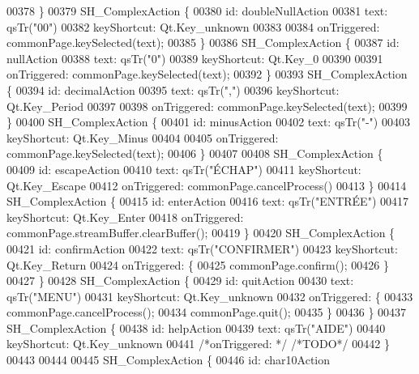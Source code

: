 \begin{DoxyCode}
00378     \}
00379     SH\_ComplexAction \{
00380         \textcolor{keywordtype}{id}: doubleNullAction
00381         text: qsTr(\textcolor{stringliteral}{"00"})
00382         keyShortcut: Qt.Key\_unknown
00383 
00384         onTriggered: commonPage.keySelected(text);
00385     \}
00386     SH\_ComplexAction \{
00387         \textcolor{keywordtype}{id}: nullAction
00388         text: qsTr(\textcolor{stringliteral}{"0"})
00389         keyShortcut: Qt.Key\_0
00390 
00391         onTriggered: commonPage.keySelected(text);
00392     \}
00393     SH\_ComplexAction \{
00394         \textcolor{keywordtype}{id}: decimalAction
00395         text: qsTr(\textcolor{stringliteral}{","})
00396         keyShortcut: Qt.Key\_Period
00397 
00398         onTriggered: commonPage.keySelected(text);
00399     \}
00400     SH\_ComplexAction \{
00401         \textcolor{keywordtype}{id}: minusAction
00402         text: qsTr(\textcolor{stringliteral}{"-"})
00403         keyShortcut: Qt.Key\_Minus
00404 
00405         onTriggered: commonPage.keySelected(text);
00406     \}
00407 
00408     SH\_ComplexAction \{
00409         \textcolor{keywordtype}{id}: escapeAction
00410         text: qsTr(\textcolor{stringliteral}{"ÉCHAP"})
00411         keyShortcut: Qt.Key\_Escape
00412         onTriggered: commonPage.cancelProcess()
00413     \}
00414     SH\_ComplexAction \{
00415         \textcolor{keywordtype}{id}: enterAction
00416         text: qsTr(\textcolor{stringliteral}{"ENTRÉE"})
00417         keyShortcut: Qt.Key\_Enter
00418         onTriggered: commonPage.streamBuffer.clearBuffer();
00419     \}
00420     SH\_ComplexAction \{
00421         \textcolor{keywordtype}{id}: confirmAction
00422         text: qsTr(\textcolor{stringliteral}{"CONFIRMER"})
00423         keyShortcut: Qt.Key\_Return
00424         onTriggered: \{
00425             commonPage.confirm();
00426         \}
00427     \}
00428     SH\_ComplexAction \{
00429         \textcolor{keywordtype}{id}: quitAction
00430         text: qsTr(\textcolor{stringliteral}{"MENU"})
00431         keyShortcut: Qt.Key\_unknown
00432         onTriggered: \{
00433             commonPage.cancelProcess();
00434             commonPage.quit();
00435         \}
00436     \}
00437     SH\_ComplexAction \{
00438         \textcolor{keywordtype}{id}: helpAction
00439         text: qsTr(\textcolor{stringliteral}{"AIDE"})
00440         keyShortcut: Qt.Key\_unknown
00441         \textcolor{comment}{/*onTriggered: */} \textcolor{comment}{/*TODO*/}
00442     \}
00443 
00444 
00445     SH\_ComplexAction \{
00446         \textcolor{keywordtype}{id}: char10Action

\end{DoxyCode}
